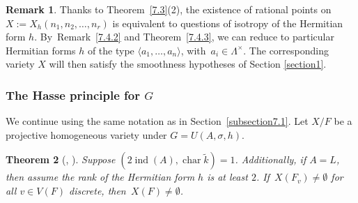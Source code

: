\documentclass[10pt]{amsart}
\DeclareMathOperator{\Char}{char}
\DeclareMathOperator{\ind}{ind}
\let\<\langle
\let\>\rangle
\newtheorem{thm}{Theorem}[section]
\theoremstyle{definition}
\newtheorem{rem}[thm]{Remark}
\begin{document}
\begin{rem}\label{evertete?}
Thanks to Theorem~\ref{7.3}(2), the existence of rational points on $X:=X_h(n_1, n_2, \dots, n_r)$ is equivalent to questions of isotropy of the Hermitian form $h$. By~Remark~\ref{7.4.2} and Theorem~\ref{7.4.3}, we can reduce to particular Hermitian forms $h$ of the type $\<a_1, \dots, a_n\>$, with~${a_i \in \Lambda^{\times}}$. The corresponding variety $X$ will then satisfy the smoothness hypotheses of Section \ref{section1}.
\end{rem}

\subsubsection{The Hasse principle for $G$} We continue using the same notation as in Section~\ref{subsection7.1}.
Let $X/F$ be a projective homogeneous variety under $G=\textit{U}(A, \sigma, h)$.

\begin{thm}[{\cite[Th.\,4.4]{wu}, \cite[Th.\,12.3]{parsur}}] \label{7.5} Suppose $(2\ind(A), \Char \widetilde{k})=1$. Addi\-tionally, if $A=L$, then assume the rank of the Hermitian form $h$ is at least $2$. If~$X(F_v) \neq \emptyset$ for all $v \in V(F)$ discrete, then~${X(F) \neq \emptyset}$.
\end{thm}
\end{document}
